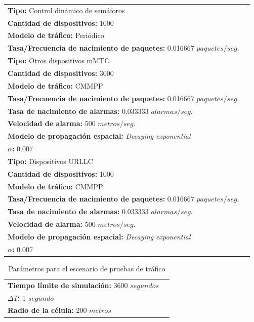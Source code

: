 \begin{table}
\begin{tabular}{|m{16cm}|p{20cm}|}
        \textbf{Tipo:} Control dinámico de semáforos\\ \textbf{Cantidad de dispositivos:} 1000 \\ \textbf{Modelo de tráfico:} Periódico \\ \textbf{Tasa/Frecuencia de nacimiento de paquetes:} 0.016667  $paquetes/seg$. \\ \hline
        \textbf{Tipo:} Otros dispositivos mMTC\\ \textbf{Cantidad de dispositivos:} 3000 \\ \textbf{Modelo de tráfico:} CMMPP \\ \textbf{Tasa/Frecuencia de nacimiento de paquetes:} 0.016667  $paquetes/seg$. \\ \textbf{Tasa de nacimiento de alarmas:} 0.033333 $alarmas/seg$. \\ \textbf{Velocidad de alarma:} 500 $metros/seg$. \\ \textbf{Modelo de propagación espacial:} \textit{Decaying exponential} \\ \textbf{$\alpha$:} 0.007  \\ \hline
        \textbf{Tipo:} Dispositivos URLLC \\ \textbf{Cantidad de dispositivos:} 1000 \\ \textbf{Modelo de tráfico:} CMMPP \\ \textbf{Tasa/Frecuencia de nacimiento de paquetes:} 0.016667  $paquetes/seg$. \\ \textbf{Tasa de nacimiento de alarmas:} 0.033333 $alarmas/seg$. \\ \textbf{Velocidad de alarma:} 500 $metros/seg$. \\ \textbf{Modelo de propagación espacial:} \textit{Decaying exponential} \\ \textbf{$\alpha$:} 0.007  \\ \hline
    \end{tabular}
\end{table}

\begin{table}
    \caption{Parámetros para el escenario de pruebas de tráfico}
    \label{tab:paramPruebaTrafico2}
    \centering
    \begin{tabular}{|m{16cm}|p{20cm}|} \\ 
        \textbf{Tiempo límite de simulación:} 3600 $segundos$ \\ \textbf{$\Delta T$:} 1 $segundo$ \\ \textbf{Radio de la célula:} 200 $metros$ \\ \hline
    \end{tabular}
\end{table}


